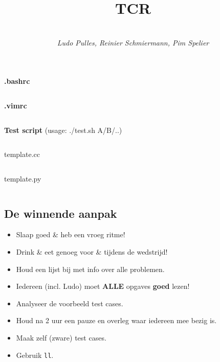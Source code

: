 \documentclass[9pt,a4paper,landscape,oneside]{amsart}
\title{TCR}
\subtitle{\textbf{\QQ} \\ \textit{Ludo Pulles, Reinier Schmiermann, Pim Spelier}}
\newcommand{\mintedstyle}[2]{\inputminted{#1}{code/#2}}
\newcommand{\code}[1]{\mintedstyle{cpp}{#1}}
\newenvironment{myitemize}
{\begin{itemize}[leftmargin=.3cm]
	\setlength{\itemsep}{0pt}
	\setlength{\parskip}{0pt}
	\setlength{\parsep}{0pt}     }
{ \end{itemize}                  }
\begin{document}
\begin{multicols*}{3}
\maketitle
\begin{comment}
\begin{center}
	\makeatletter
	\textbf{\@title} \\
	\emph{\@author}
	\makeatother
\end{center}
\end{comment}


\tableofcontents

\vfill\null \columnbreak

\begin{center}
\textbf{.bashrc}
\end{center}
\mintedstyle{bash}{.bashrc}

\begin{center}
\textbf{.vimrc}
\end{center}
\mintedstyle{vim}{.vimrc}

\textbf{Test script} (usage: ./test.sh A/B/..)
\mintedstyle{bash}{test.sh}

\begin{center}
template.cc
\end{center}

\code{T.cpp}

\begin{center}
template.py
\end{center}

\mintedstyle{python}{python.py}

\subsection{De winnende aanpak}

\begin{myitemize}
	\item Slaap goed \& heb een vroeg ritme!
	\item Drink \& eet genoeg voor \& tijdens de wedstrijd!
	\item Houd een lijst bij met info over alle problemen.
	\item Iedereen (incl. Ludo) moet {\huge\textbf{ALLE}} opgaves \textbf{goed} lezen!
	\item Analyseer de voorbeeld test cases.
	\item Houd na 2 uur een pauze en overleg waar iedereen mee bezig is.
	\item Maak zelf (zware) test cases.
	\item Gebruik \texttt{ll}.
\end{myitemize}


\end{multicols*}
\end{document}
